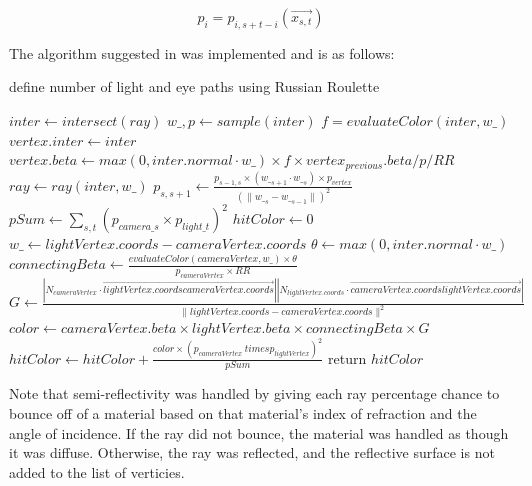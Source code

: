 \documentclass[11pt, a4paper]{article}
\begin{document}
\begin{equation}
	p_i = p_{i,s+t-i}(\vec{x_{s,t}})
\end{equation}

The algorithm suggested in \cite{Vlnas2018}\cite{agraphicsguynotes} was implemented and is as follows:

\begin{algorithm}[H]
\caption{BDPT}
	\begin{algorithmic}
			define number of light and eye paths using Russian Roulette
		
            \State $inter \gets intersect(ray)$
            \State $w\_, p \gets sample(inter)$
            \State $f = evaluateColor(inter, w\_)$
            \State $vertex.inter \gets inter$
            \State $vertex.beta \gets max(0, inter.normal \cdot w\_) \times f \times vertex_{previous}.beta / p / RR$
            \State $ray \gets ray(inter, w\_)$
		\EndFor
            \State $p_{s, s+1} \gets \frac{p_{s-1, s} \times (w\__{s+1} \cdot w\__{s}) \times p_{vertex}} {(\|w\__s - w\__{s-1}\|)^2}$
        \EndFor
        \State $pSum \gets \sum_{s, t} (p_{camera\_s} \times p_{light\_t})^2$
        \State $hitColor \gets 0$
                    \State $w\_ \gets lightVertex.coords - cameraVertex.coords$
                    \State $\theta \gets max(0, inter.normal \cdot w\_)$
                    \State $connectingBeta \gets \frac{evaluateColor(cameraVertex, w\_) \times \theta}{p_{cameraVertex} \times RR}$
                    \State $G \gets \frac{|N_{cameraVertex} \cdot \overrightarrow{lightVertex.coordscameraVertex.coords}||N_{lightVertex.coords} \cdot \overrightarrow{cameraVertex.coordslightVertex.coords}|}{\|lightVertex.coords-cameraVertex.coords\|^2}$
                    \State $color \gets cameraVertex.beta \times lightVertex.beta \times connectingBeta \times G$
                    \State $hitColor \gets hitColor + \frac{color \times (p_{cameraVertex} \ times p_{lightVertex})^2}{pSum}$
                \EndIf
            \EndFor
        \EndFor
        \State return $hitColor$
        \EndFunction
	\end{algorithmic}
\end{algorithm}
\FloatBarrier
\pagebreak
Note that semi-reflectivity was handled by giving each ray percentage chance to bounce off of a material based on that material's index of refraction and the angle of incidence. If the ray did not bounce, the material was handled as though it was diffuse. Otherwise, the ray was reflected, and the reflective surface is not added to the list of verticies.
\end{document}
